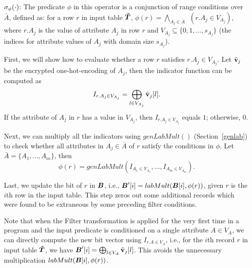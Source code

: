  $\sigma_{\phi}(\cdot)$: The predicate $\phi$ in this operator is a conjunction of range conditions over $\bar{A}$, defined as: for a row $r$ in input table $\boldsymbol{\tilde{T}}$,
$\phi(r) = \bigwedge_{A_j\in \bar{A}} ~~(r.{A_j} \in V_{A_j}),$ where $r.A_j$ is the value of attribute $A_j$ in row $r$ and $V_{A_j} \subseteq \{0,1,\ldots,s_{A_j}\}$ (the indices for attribute values of $A_{j}$ with domain size $s_{A_j}$).

First, we will show how to evaluate whether a row $r$ satisfies $r.{A_j} \in V_{A_j}$. Let $\tilde{\bf{v}}_j$ be the encrypted one-hot-encoding of $A_j$, then the indicator function can be computed as
$$I_{r.{A_j}\in V_{A_j}}=\bigoplus_{l\in V_{A_j}}\tilde{\bf{v}}_j[l].$$
If the attribute of $A_j$ in $r$ has a value in $V_{A_j}$, then $I_{r.{A_j}\in V_{A_j}}$ equals $1$; otherwise, $0$.

Next, we can multiply all the indicators using $genLabMult()$ (Section~\ref{genlab}) to check whether all attributes in $A_j\in \bar{A}$ of $r$ satisfy the conditions in $\phi$. Let $\bar{A} = \{A_1,\ldots,A_m\}$, then $$\phi(r) = genLabMult(I_{A_1\in V_{A_1}},\ldots, I_{A_m\in V_{A_m}}).$$

Last, we update the bit of $r$ in $\boldsymbol{B}$, i.e., $\boldsymbol{B}'[i] = labMult(\boldsymbol{B}[i], \phi(r))$, given $r$ is the $i$th row in the input table. This step zeros out some additional records which were found to be extraneous by some preceding filter conditions.

Note that when the \textsf{Filter} transformation is applied for the very first time in a \system program and the input predicate is conditioned on a single attribute $A \in V_A$, we can directly compute the new bit vector using $I_{r.A\in V_{A}}$, i.e., for the $i$th record $r$ in input table $\boldsymbol{\tilde{T}}$, we have $\boldsymbol{B}'[i] =\bigoplus_{l\in V_A} \tilde{\bf{v}}_j[l]$.  This avoids the unnecessary multiplication $labMult(\boldsymbol{B}[i],\phi(r))$.


